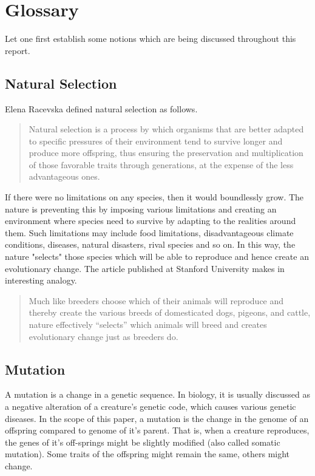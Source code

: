 \documentclass{article}
\begin{document}
\section{Glossary}

Let one first establish some notions which are being discussed throughout this report.

\subsection{Natural Selection}

Elena Racevska defined natural selection as follows.

\begin{quotation}
    Natural selection is a process by which organisms that are better adapted to specific pressures of their environment tend to survive longer and produce more offspring, thus ensuring the preservation and multiplication of those favorable traits through generations, at the expense of the less advantageous ones.
\end{quotation}

If there were no limitations on any species, then it would boundlessly grow. The nature is preventing this by imposing various limitations and creating an environment where species need to survive by adapting to the realities around them. Such limitations may include food limitations, disadvantageous climate conditions, diseases, natural disasters, rival species and so on. In this way, the nature "selects" those species which will be able to reproduce and hence create an evolutionary change. The article published at Stanford University makes in interesting analogy. 

\begin{quotation}
    Much like breeders choose which of their animals will reproduce and thereby create the various breeds of domesticated dogs, pigeons, and cattle, nature effectively “selects” which animals will breed and creates evolutionary change just as breeders do.
\end{quotation}

\subsection{Mutation}

A mutation is a change in a genetic sequence. In biology, it is usually discussed as a negative alteration of a creature's genetic code, which causes various genetic diseases. In the scope of this paper, a mutation is the change in the genome of an offspring compared to genome of it's parent. That is, when a creature reproduces, the genes of it's off-springs might be slightly modified (also called somatic mutation). Some traits of the offspring might remain the same, others might change.
\end{document}
